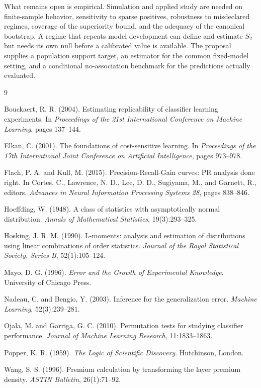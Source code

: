 \documentclass[11pt]{article}
\theoremstyle{remark}
\begin{document}
What remains open is empirical. Simulation and applied study are needed on finite-sample behavior, sensitivity to sparse positives, robustness to misdeclared regimes, coverage of the superiority bound, and the adequacy of the canonical bootstrap. A regime that repeats model development can define and estimate $S_2$ but needs its own null before a calibrated value is available. The proposal supplies a population support target, an estimator for the common fixed-model setting, and a conditional no-association benchmark for the predictions actually evaluated.

\newpage

\begin{thebibliography}{9}

Bouckaert, R. R. (2004).
Estimating replicability of classifier learning experiments.
In \emph{Proceedings of the 21st International Conference on Machine Learning}, pages 137--144.

Elkan, C. (2001).
The foundations of cost-sensitive learning.
In \emph{Proceedings of the 17th International Joint Conference on Artificial Intelligence}, pages 973--978.

Flach, P. A. and Kull, M. (2015).
Precision-Recall-Gain curves: PR analysis done right.
In Cortes, C., Lawrence, N. D., Lee, D. D., Sugiyama, M., and Garnett, R., editors,
\emph{Advances in Neural Information Processing Systems 28}, pages 838--846.

Hoeffding, W. (1948).
A class of statistics with asymptotically normal distribution.
\emph{Annals of Mathematical Statistics}, 19(3):293--325.

Hosking, J. R. M. (1990).
L-moments: analysis and estimation of distributions using linear combinations of order statistics.
\emph{Journal of the Royal Statistical Society, Series B}, 52(1):105--124.

Mayo, D. G. (1996).
\emph{Error and the Growth of Experimental Knowledge}.
University of Chicago Press.

Nadeau, C. and Bengio, Y. (2003).
Inference for the generalization error.
\emph{Machine Learning}, 52(3):239--281.

Ojala, M. and Garriga, G. C. (2010).
Permutation tests for studying classifier performance.
\emph{Journal of Machine Learning Research}, 11:1833--1863.

Popper, K. R. (1959).
\emph{The Logic of Scientific Discovery}.
Hutchinson, London.

Wang, S. S. (1996).
Premium calculation by transforming the layer premium density.
\emph{ASTIN Bulletin}, 26(1):71--92.

\end{thebibliography}
\end{document}
